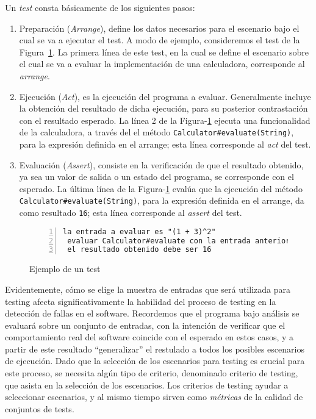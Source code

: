 Un \emph{test} consta b\'asicamente de los siguientes pasos: 
\begin{enumerate}
	\item Preparaci\'on (\emph{Arrange}), define los datos necesarios para el escenario bajo el cual se va a ejecutar el test. A modo de ejemplo, consideremos el test de la Figura~\ref{figures.examples.test.manual}. La primera l\'inea de este test, en la cual se define el escenario sobre el cual se va a evaluar la implementaci\'on de una calculadora, corresponde al \emph{arrange}.
	
	\item Ejecuci\'on (\emph{Act}), es la ejecuci\'on del programa a evaluar. Generalmente incluye la obtenci\'on del resultado de dicha ejecuci\'on, para su posterior contrastaci\'on con el resultado esperado. La l\'inea 2 de la Figura-\ref{figures.examples.test.manual} ejecuta una funcionalidad de la calculadora, a trav\'es del el m\'etodo \texttt{Calculator\#evaluate(String)}, para la expresi\'on definida en el arrange; esta l\'inea corresponde al \emph{act} del test. 
	
	\item Evaluaci\'on (\emph{Assert}), consiste en la verificaci\'on de que el resultado obtenido, ya sea un valor de salida o un estado del programa, se corresponde con el esperado. La \'ultima l\'inea de la Figura-\ref{figures.examples.test.manual} eval\'ua que la ejecuci\'on del m\'etodo \texttt{Calculator\#evaluate(String)}, para la expresi\'on definida en el arrange, da como resultado \texttt{16}; esta l\'inea corresponde al \emph{assert} del test.
\end{enumerate}

\begin{figure}
	\begin{lstlisting}[frame=single, mathescape=true,numbers=left,framexleftmargin=1.5em]
 la entrada a evaluar es "(1 + 3)^2"
 evaluar Calculator#evaluate con la entrada anterior
 el resultado obtenido debe ser 16
	\end{lstlisting}
	\caption{Ejemplo de un test}
	\label{figures.examples.test.manual}
\end{figure}

Evidentemente, c\'omo se elige la muestra de entradas que ser\'a utilizada para testing afecta significativamente la habilidad del proceso de testing en la detecci\'on de fallas en el software. Recordemos que el programa bajo an\'alisis se evaluar\'a sobre un conjunto de entradas, con la intenci\'on de verificar que el comportamiento real del software coincide con el esperado en estos casos, y a partir de este resultado ``generalizar'' el restulado a todos los posibles escenarios de ejecuci\'on. Dado que la selecci\'on de los escenarios para testing es crucial para este proceso, se necesita alg\'un tipo de criterio, denominado criterio de testing, que asista en la selecci\'on de los escenarios. Los criterios de testing ayudar a seleccionar escenarios, y al mismo tiempo sirven como \emph{m\'etricas} de la calidad de conjuntos de tests. 


